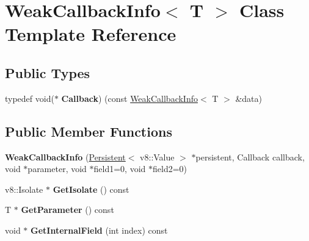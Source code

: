 \hypertarget{class_weak_callback_info}{}\section{Weak\+Callback\+Info$<$ T $>$ Class Template Reference}
\label{class_weak_callback_info}
\subsection*{Public Types}
\begin{DoxyCompactItemize}
\item 
\mbox{\label{class_weak_callback_info_a6be885c430d7044c099924bd53cfc758}} 
typedef void($\ast$ {\bfseries Callback}) (const \hyperlink{class_weak_callback_info}{Weak\+Callback\+Info}$<$ T $>$ \&data)
\end{DoxyCompactItemize}
\subsection*{Public Member Functions}
\begin{DoxyCompactItemize}
\item 
\mbox{\label{class_weak_callback_info_a05fec27f88ebde259b4e28c585a39cb6}} 
{\bfseries Weak\+Callback\+Info} (\hyperlink{class_persistent}{Persistent}$<$ v8\+::\+Value $>$ $\ast$persistent, Callback callback, void $\ast$parameter, void $\ast$field1=0, void $\ast$field2=0)
\item 
\mbox{\label{class_weak_callback_info_ab264cb56571d7bcc1f69ee23d12957b3}} 
v8\+::\+Isolate $\ast$ {\bfseries Get\+Isolate} () const
\item 
\mbox{\label{class_weak_callback_info_ae67bf5e2b1d05cebdbefd3c0ca5171b4}} 
T $\ast$ {\bfseries Get\+Parameter} () const
\item 
\mbox{\label{class_weak_callback_info_ae98508f3e7da4418a3aa717b34eed96e}} 
void $\ast$ {\bfseries Get\+Internal\+Field} (int index) const
\end{DoxyCompactItemize}
